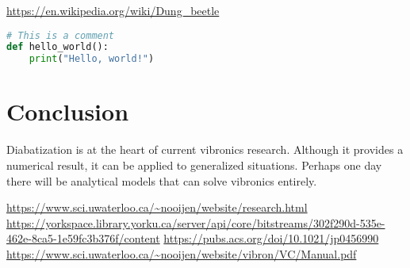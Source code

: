 

\url{https://en.wikipedia.org/wiki/Dung_beetle}



\begin{lstlisting}[language=Python, caption=Example Python Code]
# This is a comment
def hello_world():
    print("Hello, world!")
\end{lstlisting}



\chapter{Conclusion}
Diabatization is at the heart of current vibronics research. Although it provides a numerical result, it can be applied to generalized situations. Perhaps one day there will be analytical models that can solve vibronics entirely.


\url{https://www.sci.uwaterloo.ca/~nooijen/website/research.html}
\url{https://yorkspace.library.yorku.ca/server/api/core/bitstreams/302f290d-535e-462e-8ca5-1e59fc3b376f/content}
\url{https://pubs.acs.org/doi/10.1021/jp0456990}
\url{https://www.sci.uwaterloo.ca/~nooijen/website/vibron/VC/Manual.pdf}